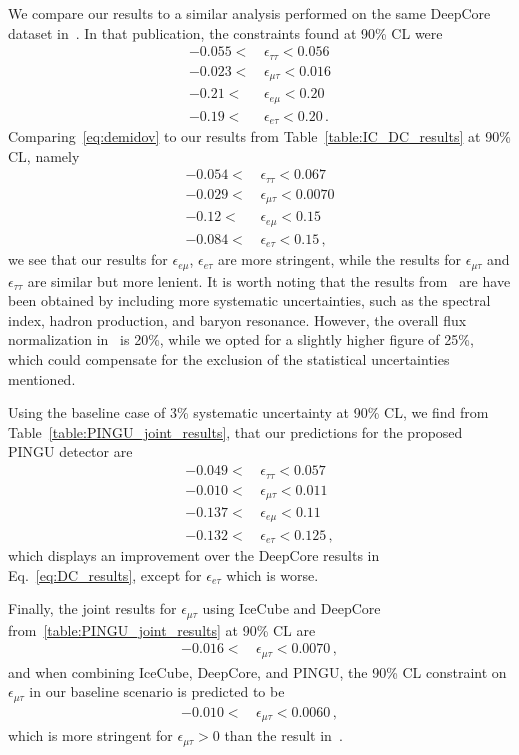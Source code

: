 \documentclass{article}
\newcommand{\emt}{\ensuremath{\epsilon_{\mu\tau}}}
\newcommand{\eet}{\epsilon_{e\tau}}
\newcommand{\eem}{\epsilon_{e\mu}}
\newcommand{\ett}{\ensuremath{\epsilon_{\tau\tau}}}
\begin{document}
{{ We compare our results to a similar analysis performed on the same DeepCore dataset in~\cite{demidov}. In that publication, 
 the constraints found at 90\% CL were 
 \begin{align}\label{eq:demidov}
    -0.055 <&\, \ett < 0.056 \nonumber \\
    -0.023 <&\, \emt < 0.016 \nonumber \\
    -0.21 <&\, \eem < 0.20 \nonumber \\
    -0.19 <&\, \eet < 0.20\,.
 \end{align}
 Comparing~\ref{eq:demidov} to our results from Table~\ref{table:IC_DC_results} at 90\% CL, namely
 \begin{align}\label{eq:DC_results}
    -0.054 <&\, \ett < 0.067 \nonumber \\
    -0.029 <&\, \emt < 0.0070 \nonumber \\
    -0.12 <&\, \eem < 0.15 \nonumber \\
    -0.084 <&\, \eet < 0.15\,,
 \end{align}
 we see that our results for $\eem$, $\eet$ are more stringent, while the results for $\emt$ and $\ett$ are similar but more lenient. It is worth noting that the 
 results from~\cite{demidov} are have been obtained by including more systematic uncertainties, such as the spectral index, hadron production, and baryon resonance. 
 However, the overall flux normalization in~\cite{demidov} is 20\%, while we opted for a slightly higher figure of 25\%, which could compensate for the exclusion of the 
 statistical uncertainties mentioned.
 
 Using the baseline case of 3\% systematic uncertainty at 90\% CL, we find from Table~\ref{table:PINGU_joint_results}, that our predictions for the proposed PINGU detector are
 \begin{align}\label{eq:P_results}
    -0.049 <&\, \ett < 0.057 \nonumber \\
    -0.010 <&\, \emt < 0.011 \nonumber \\
    -0.137 <&\, \eem < 0.11 \nonumber \\
    -0.132 <&\, \eet < 0.125\,,
 \end{align}
 which displays an improvement over the DeepCore results in Eq.~\ref{eq:DC_results}, except for $\eet$ which is worse.
 
 Finally, the joint results for $\emt$ using IceCube and DeepCore from~\ref{table:PINGU_joint_results} at 90\% CL are
 \begin{align}\label{eq:ID_result}
    -0.016 <&\, \emt < 0.0070\,,
 \end{align}
 and when combining IceCube, DeepCore, and PINGU, the 90\% CL constraint on $\emt$ in our baseline scenario is predicted to be
 \begin{align}\label{eq:PID_result}
    -0.010 <&\, \emt < 0.0060\,,
 \end{align}
 which is more stringent for $\emt>0$ than the result in~\cite{deepcoreNSI}.
 
}}
\end{document}
